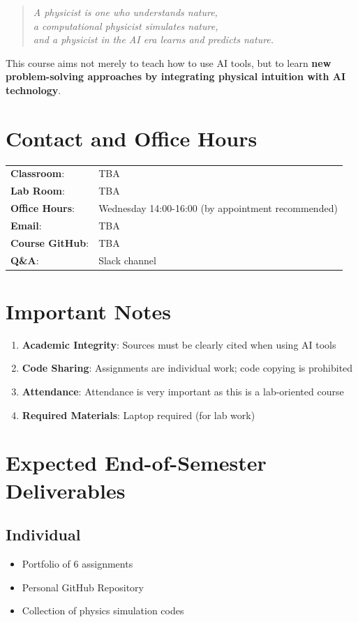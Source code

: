 \documentclass[11pt,a4paper]{article}
\begin{document}
\begin{quote}
\textit{A physicist is one who understands nature,\\
a computational physicist simulates nature,\\
and a physicist in the AI era learns and predicts nature.}
\end{quote}

This course aims not merely to teach how to use AI tools, but to learn \textbf{new problem-solving approaches by integrating physical intuition with AI technology}.

\section{Contact and Office Hours}

\begin{tabular}{ll}
\textbf{Classroom}: & TBA \\
\textbf{Lab Room}: & TBA \\
\textbf{Office Hours}: & Wednesday 14:00-16:00 (by appointment recommended) \\
\textbf{Email}: & TBA \\
\textbf{Course GitHub}: & TBA \\
\textbf{Q\&A}: & Slack channel \\
\end{tabular}

\section{Important Notes}

\begin{enumerate}[noitemsep]
    \item \textbf{Academic Integrity}: Sources must be clearly cited when using AI tools
    \item \textbf{Code Sharing}: Assignments are individual work; code copying is prohibited
    \item \textbf{Attendance}: Attendance is very important as this is a lab-oriented course
    \item \textbf{Required Materials}: Laptop required (for lab work)
\end{enumerate}

\section{Expected End-of-Semester Deliverables}

\subsection{Individual}
\begin{itemize}[noitemsep]
    \item Portfolio of 6 assignments
    \item Personal GitHub Repository
    \item Collection of physics simulation codes
\end{itemize}
\end{document}
